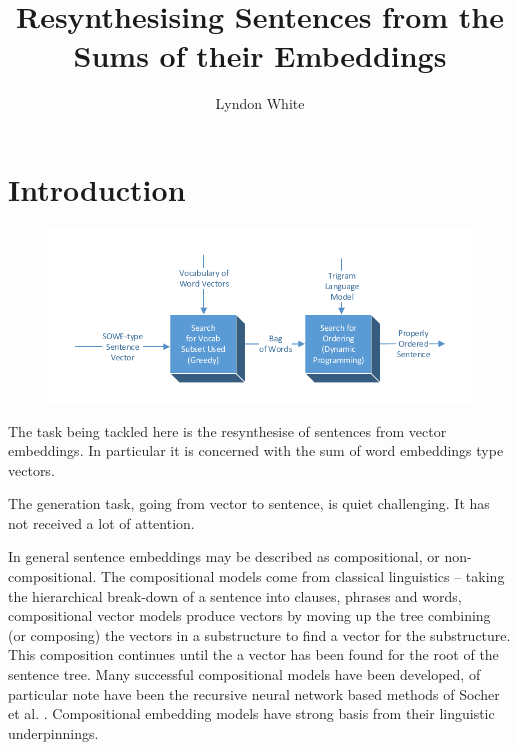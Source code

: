 \documentclass[]{scrartcl}
\title{Resynthesising Sentences from the Sums of their Embeddings}
\author{Lyndon White}
\begin{document}
\maketitle

\begin{abstract}

\end{abstract}

\section{Introduction}


\begin{figure}
	\centering 
	\includegraphics{block_diagram}
\end{figure}
The task being tackled here is the resynthesise of sentences from vector embeddings.
In particular it is concerned with the sum of word embeddings type vectors.


The generation task, going from vector to sentence, is quiet challenging.
It has not received a lot of attention.



In general sentence embeddings may be described as compositional, or non-compositional.
The compositional models come from classical linguistics -- taking the hierarchical  break-down of a sentence into clauses, phrases and words, compositional vector models produce vectors by moving up the tree combining (or composing) the vectors in a substructure to find a vector for the substructure. This composition continues until the a vector has been found for the root of the sentence tree. Many successful compositional models have been developed, of particular note have been the recursive neural network based methods of Socher et al.  \cite{socher2010PhraseEmbedding,SocherEtAl2011:RAE,SocherEtAl2011:PoolRAE,Socher2011ParsingPhrases,SocherMVRNN,RvNTN,SocherEtAl2013:CVG,Socher2013TensorReasoning}. Compositional embedding models have strong basis from their linguistic underpinnings.
\end{document}
